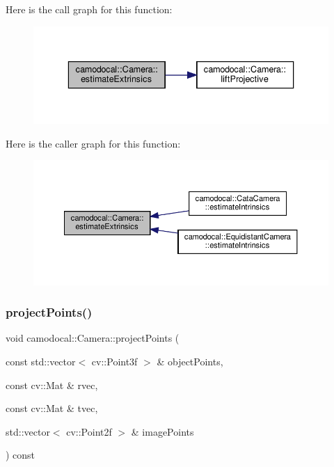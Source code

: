 Here is the call graph for this function\+:\nopagebreak
\begin{figure}[H]
\begin{center}
\leavevmode
\includegraphics[width=336pt]{classcamodocal_1_1Camera_a2a6d99ee0927e0336b4d77a9773900a4_cgraph}
\end{center}
\end{figure}
Here is the caller graph for this function\+:\nopagebreak
\begin{figure}[H]
\begin{center}
\leavevmode
\includegraphics[width=350pt]{classcamodocal_1_1Camera_a2a6d99ee0927e0336b4d77a9773900a4_icgraph}
\end{center}
\end{figure}
\mbox{\label{classcamodocal_1_1Camera_ab8dfa1aa8a60c5569920939ba7d85440}} 
\subsubsection{\texorpdfstring{project\+Points()}{projectPoints()}}
{\footnotesize\ttfamily void camodocal\+::\+Camera\+::project\+Points (\begin{DoxyParamCaption}\item[{const std\+::vector$<$ cv\+::\+Point3f $>$ \&}]{object\+Points,  }\item[{const cv\+::\+Mat \&}]{rvec,  }\item[{const cv\+::\+Mat \&}]{tvec,  }\item[{std\+::vector$<$ cv\+::\+Point2f $>$ \&}]{image\+Points }\end{DoxyParamCaption}) const}



